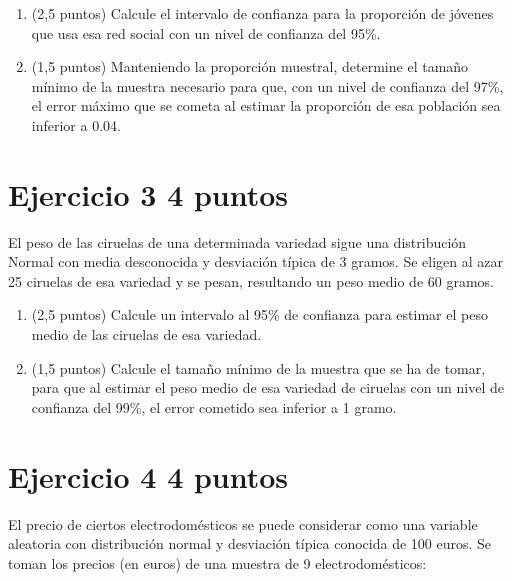 \documentclass[11pt]{article}
\begin{document}
\begin{enumerate}[label=(\alph*)]
  \item (2,5 puntos)  Calcule el intervalo de confianza para la proporción de jóvenes que usa esa red social con un nivel de confianza del 95\%.

  

  \item (1,5 puntos)  Manteniendo la proporción muestral, determine el tamaño mínimo de la muestra necesario para que, con un nivel de confianza del 97\%, el error máximo que se cometa al estimar la proporción de esa población sea inferior a 0.04.

  

\end{enumerate}



\clearpage
\section*{Ejercicio 3 \hfill 4 puntos}
 El peso de las ciruelas de una determinada variedad sigue una distribución Normal con media desconocida y desviación típica de 3 gramos. Se eligen al azar 25 ciruelas de esa variedad y se pesan, resultando un peso medio de 60 gramos.

\begin{enumerate}[label=(\alph*)]

  \item (2,5 puntos)  Calcule un intervalo al 95\% de confianza para estimar el peso medio de las ciruelas de esa variedad.

  

  \item (1,5 puntos)  Calcule el tamaño mínimo de la muestra que se ha de tomar, para que al estimar el peso medio de esa variedad de ciruelas con un nivel de confianza del 99\%, el error cometido sea inferior a 1 gramo.

  

\end{enumerate}


\section*{Ejercicio 4 \hfill 4 puntos}
 El precio de ciertos electrodomésticos se puede considerar como una variable aleatoria con distribución normal y desviación típica conocida de 100 euros. Se toman los precios (en euros) de una muestra de 9 electrodomésticos:
\end{document}
